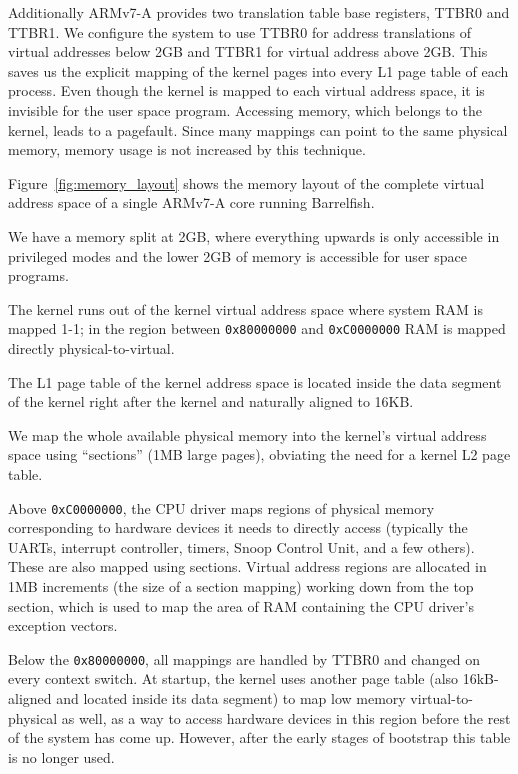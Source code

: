 \documentclass[a4paper,twoside]{report} %
\begin{document}
Additionally ARMv7-A provides two translation table
base registers, TTBR0 and TTBR1. We configure the system to use
TTBR0 for address translations of virtual addresses below 2GB and
TTBR1 for virtual address above 2GB. This saves us the explicit
mapping of the kernel pages into every L1 page table of each process.
Even though the kernel is mapped to each virtual address space, it is
invisible for the user space program. Accessing memory, which belongs
to the kernel, leads to a pagefault. Since many mappings can point to
the same physical memory, memory usage is not increased by this
technique.

Figure~\ref{fig:memory_layout} shows the memory layout of the complete
virtual address space of a single ARMv7-A core running Barrelfish. 

We have a memory split at 2GB, where everything upwards is only
accessible in privileged modes and the lower 2GB of memory is
accessible for user space programs. 

The kernel runs out of the kernel virtual address space where system
RAM is mapped 1-1; in the region between \texttt{0x80000000} and
\texttt{0xC0000000} RAM is mapped directly physical-to-virtual.

The L1 page table of the kernel address space is located inside the
data segment of the kernel right after the
kernel and naturally aligned to 16KB.  

We map the whole available physical memory into the kernel’s virtual
address space using ``sections'' (1MB large pages), obviating the need
for a kernel L2 page table. 

Above \texttt{0xC0000000}, the CPU driver maps regions of physical
memory corresponding to hardware devices it needs to directly access
(typically the UARTs, interrupt controller, timers, Snoop Control
Unit, and a few others).  These are also mapped using sections.
Virtual address regions are allocated in 1MB increments (the size of a
section mapping) working down from the top section, which is used to
map the area of RAM containing the CPU driver's exception vectors. 

Below the \texttt{0x80000000}, all mappings are handled by TTBR0 and
changed on every context switch.  At startup, the kernel uses another
page table (also 16kB-aligned and located inside its data segment) to
map low memory virtual-to-physical as well, as a way to access
hardware devices in this region before the rest of the system has come
up.  However, after the early stages of bootstrap this table is no
longer used. 
\end{document}

